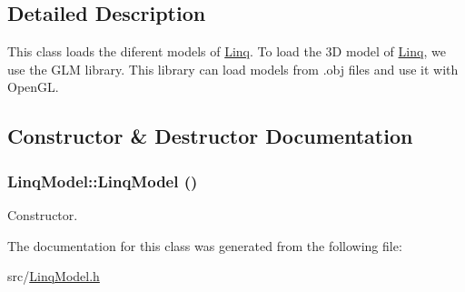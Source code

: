 \subsection{Detailed Description}
This class loads the diferent models of \hyperlink{classLinq}{Linq}. To load the 3D model of \hyperlink{classLinq}{Linq}, we use the GLM library. This library can load models from .obj files and use it with OpenGL. 

\subsection{Constructor \& Destructor Documentation}
\hypertarget{classLinqModel_a6e14a12514a58d4ab064549cfee41b93}{
\subsubsection[{LinqModel}]{\setlength{\rightskip}{0pt plus 5cm}LinqModel::LinqModel ()}}
\label{classLinqModel_a6e14a12514a58d4ab064549cfee41b93}
Constructor. 

The documentation for this class was generated from the following file:\begin{DoxyCompactItemize}
\item 
src/\hyperlink{LinqModel_8h}{LinqModel.h}\end{DoxyCompactItemize}
